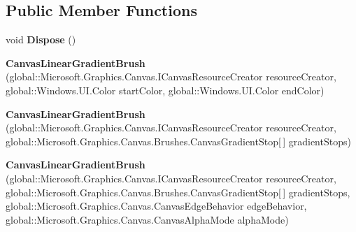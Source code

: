 \subsection*{Public Member Functions}
\begin{DoxyCompactItemize}
\item 
\mbox{\label{class_microsoft_1_1_graphics_1_1_canvas_1_1_brushes_1_1_canvas_linear_gradient_brush_af7428e4f8e3d528affde23a40ae75b52}} 
void {\bfseries Dispose} ()
\item 
\mbox{\label{class_microsoft_1_1_graphics_1_1_canvas_1_1_brushes_1_1_canvas_linear_gradient_brush_a4b33cfab37ecd3d6b6bef46dae48c88c}} 
{\bfseries Canvas\+Linear\+Gradient\+Brush} (global\+::\+Microsoft.\+Graphics.\+Canvas.\+I\+Canvas\+Resource\+Creator resource\+Creator, global\+::\+Windows.\+U\+I.\+Color start\+Color, global\+::\+Windows.\+U\+I.\+Color end\+Color)
\item 
\mbox{\label{class_microsoft_1_1_graphics_1_1_canvas_1_1_brushes_1_1_canvas_linear_gradient_brush_a60887ec32c82a971148a38aea74b62ea}} 
{\bfseries Canvas\+Linear\+Gradient\+Brush} (global\+::\+Microsoft.\+Graphics.\+Canvas.\+I\+Canvas\+Resource\+Creator resource\+Creator, global\+::\+Microsoft.\+Graphics.\+Canvas.\+Brushes.\+Canvas\+Gradient\+Stop\mbox{[}$\,$\mbox{]} gradient\+Stops)
\item 
\mbox{\label{class_microsoft_1_1_graphics_1_1_canvas_1_1_brushes_1_1_canvas_linear_gradient_brush_a84d29f89ab093f50d09215ddab09cbf1}} 
{\bfseries Canvas\+Linear\+Gradient\+Brush} (global\+::\+Microsoft.\+Graphics.\+Canvas.\+I\+Canvas\+Resource\+Creator resource\+Creator, global\+::\+Microsoft.\+Graphics.\+Canvas.\+Brushes.\+Canvas\+Gradient\+Stop\mbox{[}$\,$\mbox{]} gradient\+Stops, global\+::\+Microsoft.\+Graphics.\+Canvas.\+Canvas\+Edge\+Behavior edge\+Behavior, global\+::\+Microsoft.\+Graphics.\+Canvas.\+Canvas\+Alpha\+Mode alpha\+Mode)
\item 
\mbox{\label{class_microsoft_1_1_graphics_1_1_canvas_1_1_brushes_1_1_canvas_linear_gradient_brush_a5fbbd2cc60fa7f11f4ce627c5a243729}} 

\end{DoxyCompactItemize}
